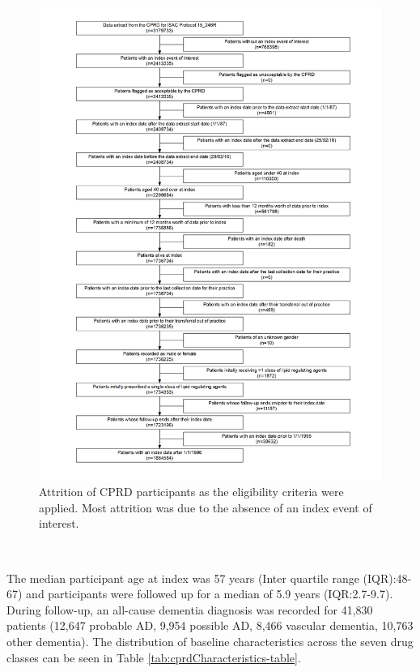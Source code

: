 \documentclass[a4paper, twoside]{templates/ociamthesis}
\begin{document}
\begin{figure}[H]
\includegraphics[width=1\linewidth]{figures/cprd-analysis/cohort_attrition} \caption[Attrition of CPRD participants]{Attrition of CPRD participants as the eligibility criteria were applied. Most attrition was due to the absence of an index event of interest.}\label{fig:cprdFlowchart}
\end{figure}

~

The median participant age at index was 57 years (Inter quartile range (IQR):48-67) and participants were followed up for a median of 5.9 years (IQR:2.7-9.7). During follow-up, an all-cause dementia diagnosis was recorded for 41,830 patients (12,647 probable AD, 9,954 possible AD, 8,466 vascular dementia, 10,763 other dementia). The distribution of baseline characteristics across the seven drug classes can be seen in Table \ref{tab:cprdCharacteristics-table}.
\end{document}
